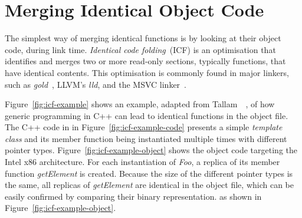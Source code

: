 
\section{Merging Identical Object Code}

The simplest way of merging identical functions is by looking at their object code, during link time.
\textit{Identical code folding}~(ICF) is an optimisation that identifies and merges two or more read-only sections, typically functions, that have identical contents.
This optimisation is commonly found in major linkers, such as \textit{gold}~\cite{tallam10,kwan12}, LLVM's \textit{lld}, and the MSVC linker~\cite{msvc-icf}.

Figure~\ref{fig:icf-example} shows an example, adapted from Tallam~\etal~\cite{tallam10},
of how generic programming in C++ can lead to identical functions in the object file.
The C++ code in in Figure~\ref{fig:icf-example-code} presents
a simple \textit{template class} and its member function being
instantiated multiple times with different pointer types.
Figure~\ref{fig:icf-example-object} shows the object code 
targeting the Intel x86 architecture.
For each instantiation of \textit{Foo}, a replica of its member
function \textit{getElement} is created.
Because the size of the different pointer types is the same,
all replicas of \textit{getElement} are identical
in the object file, which can be easily confirmed by
comparing their binary representation. as shown in
Figure~\ref{fig:icf-example-object}.

